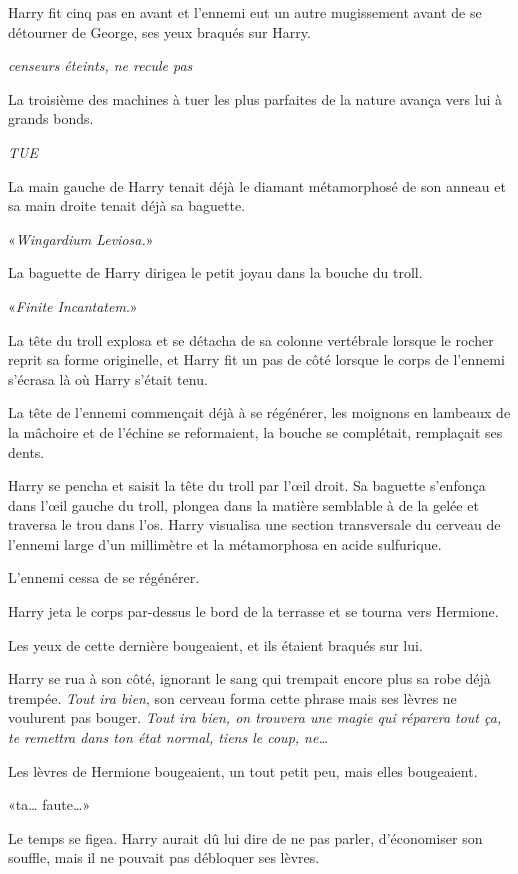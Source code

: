 Harry fit cinq pas en avant et l'ennemi eut un autre mugissement avant de se détourner de George, ses yeux braqués sur Harry.

\emph{censeurs éteints, ne recule pas}

La troisième des machines à tuer les plus parfaites de la nature avança vers lui à grands bonds.

\emph{TUE}

La main gauche de Harry tenait déjà le diamant métamorphosé de son anneau et sa main droite tenait déjà sa baguette.

«\emph{Wingardium Leviosa.}»

La baguette de Harry dirigea le petit joyau dans la bouche du troll.

«\emph{Finite Incantatem}.»

La tête du troll explosa et se détacha de sa colonne vertébrale lorsque le rocher reprit sa forme originelle, et Harry fit un pas de côté lorsque le corps de l'ennemi s'écrasa là où Harry s'était tenu.

La tête de l'ennemi commençait déjà à se régénérer, les moignons en lambeaux de la mâchoire et de l'échine se reformaient, la bouche se complétait, remplaçait ses dents.

Harry se pencha et saisit la tête du troll par l'œil droit. Sa baguette s'enfonça dans l'œil gauche du troll, plongea dans la matière semblable à de la gelée et traversa le trou dans l'os. Harry visualisa une section transversale du cerveau de l'ennemi large d'un millimètre et la métamorphosa en acide sulfurique.

L'ennemi cessa de se régénérer.

Harry jeta le corps par-dessus le bord de la terrasse et se tourna vers Hermione.

Les yeux de cette dernière bougeaient, et ils étaient braqués sur lui.

Harry se rua à son côté, ignorant le sang qui trempait encore plus sa robe déjà trempée. \emph{Tout ira bien}, son cerveau forma cette phrase mais ses lèvres ne voulurent pas bouger. \emph{Tout ira bien, on trouvera une magie qui réparera tout ça, te remettra dans ton état normal, tiens le coup, ne…}

Les lèvres de Hermione bougeaient, un tout petit peu, mais elles bougeaient.

«ta… faute…»

Le temps se figea. Harry aurait dû lui dire de ne pas parler, d'économiser son souffle, mais il ne pouvait pas débloquer ses lèvres.


